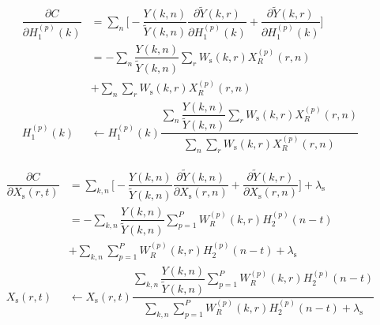 \begin{align}
\dfrac{\partial C}{\partial H_1^{(p)}(k)} &= \sum_n \Bigg[-\dfrac{Y(k,n)}{\tilde{Y}(k,n)} \dfrac{\partial \tilde{Y}(k,r)}{\partial H_1^{(p)}(k)} + \dfrac{\partial \tilde{Y}(k,r)}{\partial H_1^{(p)}(k)} \Bigg] \nonumber \\
&= -\sum_n \dfrac{Y(k,n)}{\tilde{Y}(k,n)} \sum_r W_{\text{s}}(k,r)X_R^{(p)}(r,n)\nonumber \\ 
& + \sum_n \sum_r W_{\text{s}}(k,r) X_R^{(p)}(r,n) \nonumber \\
H_1^{(p)}(k) &\leftarrow H_1^{(p)}(k) \dfrac{\sum\limits_n \dfrac{Y(k,n)}{\tilde{Y}(k,n)}\sum\limits_r W_{\text{s}}(k,r)X_R^{(p)}(r,n)}{\sum\limits_n \sum\limits_r W_{\text{s}}(k,r) X_R^{(p)}(r,n)}
\label{eq:updateH1}
\end{align}

\begin{align}
\dfrac{\partial C}{\partial X_{\text{s}}(r,t)} &= \sum_{k,n} \Bigg[-\dfrac{Y(k,n)}{\tilde{Y}(k,n)} \dfrac{\partial \tilde{Y}(k,n)}{\partial X_{\text{s}}(r,n)} + \dfrac{\partial \tilde{Y}(k,r)}{\partial X_{\text{s}}(r,n)} \Bigg] + \lambda_{\text{s}}  \nonumber \\
&= -\sum_{k,n} \dfrac{Y(k,n)}{\tilde{Y}(k,n)} \sum_{p=1}^P W_R^{(p)}(k,r)H_2^{(p)}(n-t)\nonumber \\ 
& + \sum_{k,n} \sum_{p=1}^P W_R^{(p)}(k,r)H_2^{(p)}(n-t) + \lambda_{\text{s}}  \nonumber \\
X_{\text{s}}(r,t) &\leftarrow X_{\text{s}}(r,t) \dfrac{\sum\limits_{k,n} \dfrac{Y(k,n)}{\tilde{Y}(k,n)}\sum\limits_{p=1}^P W_R^{(p)}(k,r)H_2^{(p)}(n-t)}{\sum\limits_{k,n} \sum\limits_{p=1}^P W_R^{(p)}(k,r)H_2^{(p)}(n-t)+ \lambda_{\text{s}} }
\label{eq:updateXs}
\end{align}

